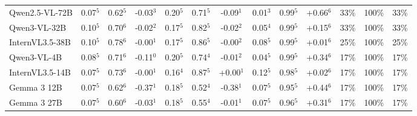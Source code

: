 \begin{table}[t]
{\begin{tabular}{l@{\hspace{3pt}}ccc@{\hspace{4pt}}ccc@{\hspace{4pt}}ccc@{\hspace{4pt}}ccc}
Qwen2.5-VL-72B & \cellcolor{cfSage2}0.07$^{5}$ & \cellcolor{cfSage2}0.62$^{5}$ & \cellcolor{cfSlate2}-0.03$^{3}$ & \cellcolor{cfSage3}0.20$^{5}$ & \cellcolor{cfSage2}0.71$^{5}$ & \cellcolor{cfSlate2}-0.09$^{1}$ & \cellcolor{cfSage1}0.01$^{3}$ & \cellcolor{cfSage4}0.99$^{5}$ & \cellcolor{cfTerra4}+0.66$^{6}$ & \cellcolor{cfTerra3}33\% & \cellcolor{cfTerra4}100\% & 33\% \\
Qwen3-VL-32B & \cellcolor{cfSage2}0.10$^{5}$ & \cellcolor{cfSage2}0.70$^{6}$ & \cellcolor{cfSlate2}-0.02$^{2}$ & \cellcolor{cfSage3}0.17$^{5}$ & \cellcolor{cfSage3}0.82$^{5}$ & \cellcolor{cfSlate2}-0.02$^{2}$ & \cellcolor{cfSage2}0.05$^{4}$ & \cellcolor{cfSage4}0.99$^{5}$ & \cellcolor{cfTerra3}+0.15$^{6}$ & \cellcolor{cfTerra3}33\% & \cellcolor{cfTerra4}100\% & 33\% \\
InternVL3.5-38B & \cellcolor{cfSage2}0.10$^{5}$ & \cellcolor{cfSage3}0.78$^{6}$ & \cellcolor{cfSlate1}-0.00$^{1}$ & \cellcolor{cfSage3}0.17$^{5}$ & \cellcolor{cfSage3}0.86$^{5}$ & \cellcolor{cfSlate1}-0.00$^{2}$ & \cellcolor{cfSage2}0.08$^{5}$ & \cellcolor{cfSage4}0.99$^{5}$ & \cellcolor{cfTerra1}+0.01$^{6}$ & \cellcolor{cfTerra3}25\% & \cellcolor{cfTerra4}100\% & 25\% \\
Qwen3-VL-4B & \cellcolor{cfSage2}0.08$^{5}$ & \cellcolor{cfSage2}0.71$^{6}$ & \cellcolor{cfSlate3}-0.11$^{0}$ & \cellcolor{cfSage4}0.20$^{5}$ & \cellcolor{cfSage2}0.74$^{4}$ & \cellcolor{cfSlate1}-0.01$^{2}$ & \cellcolor{cfSage1}0.04$^{5}$ & \cellcolor{cfSage4}0.99$^{5}$ & \cellcolor{cfTerra4}+0.34$^{6}$ & \cellcolor{cfTerra3}17\% & \cellcolor{cfTerra4}100\% & 17\% \\
InternVL3.5-14B & \cellcolor{cfSage2}0.07$^{5}$ & \cellcolor{cfSage2}0.73$^{6}$ & \cellcolor{cfSlate1}-0.00$^{1}$ & \cellcolor{cfSage3}0.16$^{4}$ & \cellcolor{cfSage3}0.87$^{5}$ & \cellcolor{cfTerra1}+0.00$^{1}$ & \cellcolor{cfSage3}0.12$^{5}$ & \cellcolor{cfSage4}0.98$^{5}$ & \cellcolor{cfTerra1}+0.02$^{6}$ & \cellcolor{cfTerra3}17\% & \cellcolor{cfTerra4}100\% & 17\% \\
Gemma 3 12B & \cellcolor{cfSage2}0.07$^{5}$ & \cellcolor{cfSage2}0.62$^{6}$ & \cellcolor{cfSlate4}-0.37$^{1}$ & \cellcolor{cfSage3}0.18$^{5}$ & \cellcolor{cfSage1}0.52$^{4}$ & \cellcolor{cfSlate4}-0.38$^{1}$ & \cellcolor{cfSage2}0.07$^{5}$ & \cellcolor{cfSage4}0.95$^{5}$ & \cellcolor{cfTerra4}+0.44$^{6}$ & \cellcolor{cfTerra3}17\% & \cellcolor{cfTerra4}100\% & 17\% \\
Gemma 3 27B & \cellcolor{cfSage2}0.07$^{5}$ & \cellcolor{cfSage2}0.60$^{6}$ & \cellcolor{cfSlate2}-0.03$^{1}$ & \cellcolor{cfSage3}0.18$^{5}$ & \cellcolor{cfSage1}0.55$^{4}$ & \cellcolor{cfSlate1}-0.01$^{1}$ & \cellcolor{cfSage2}0.07$^{5}$ & \cellcolor{cfSage4}0.96$^{5}$ & \cellcolor{cfTerra4}+0.31$^{6}$ & \cellcolor{cfTerra3}17\% & \cellcolor{cfTerra4}100\% & 17\% \\

\end{tabular}}
\end{table}

